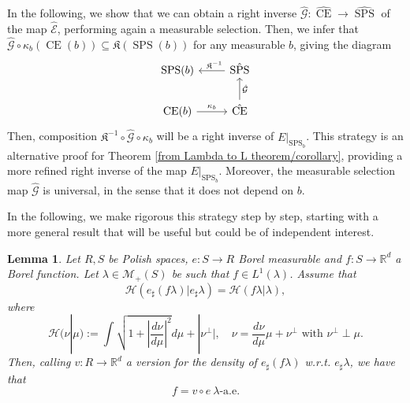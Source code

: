 \documentclass[10pt,leqno]{amsart}
\numberwithin{equation}{section}
\newtheorem{lemma}[teorema]{Lemma}
\newcommand{\R}{\mathbb{R}}
\newcommand{\CE}{\operatorname{CE}}
\begin{document}
In the following, we show that we can obtain a right inverse $\hat{\mathcal{G}}:\hat{\CE} \to \hat{\operatorname{SPS}}$ of the map $\hat{\mathcal{E}}$, performing again a measurable selection. Then, we infer that $\hat{\mathcal{G}}\circ \kappa_b(\operatorname{CE}(b)) \subseteq \mathfrak{K}(\operatorname{SPS}(b))$ for any measurable $b$, giving the diagram
\begin{equation}\label{eq: resulting diagram}
\begin{tikzcd}
  \operatorname{SPS}(b)  &  \hat{\operatorname{SPS}} \arrow[l, "\hspace{0.15cm}\mathfrak{K}^{-1}"']\\
  \CE(b) \arrow[r, "\kappa_b"] & \hat{\CE} \arrow[u, "\hat{\mathcal{G}}"']
\end{tikzcd}
\end{equation}
Then, composition $\mathfrak{K}^{-1}\circ \hat{\mathcal{G}}\circ\kappa_b$ will be a right inverse of $E|_{\operatorname{SPS}_b}$.
This strategy is an alternative proof for Theorem \ref{from Lambda to L theorem/corollary}, providing a more refined right inverse of the map $E|_{\operatorname{SPS}_b}$. Moreover, the measurable selection map $\hat{\mathcal{G}}$ is universal, in the sense that it does not depend on $b$.

In the following, we make rigorous this strategy step by step, starting with a more general result that will be useful but could be of independent interest.






\begin{lemma}\label{f = v circ e}
    Let $R,S$ be Polish spaces, $e:S\to R$ Borel measurable and $f:S\to \R^d$ a Borel function. 
    Let $\lambda\in \mathcal{M}_+(S) $ be such that $f\in L^1(\lambda)$. Assume that 
    \[\mathcal{H}\left( e_\sharp (f\lambda) | e_\sharp \lambda \right) = \mathcal{H}(f\lambda|\lambda),\]
    where 
    \[\mathcal{H}(\nu|\mu) := \int \sqrt{1+\left|\frac{d\nu}{d\mu}\right|^2} d\mu + |\nu^\perp|, \quad \nu = \frac{d\nu}{d\mu} \mu + \nu^{\perp} \text{ with }\nu^\perp \perp \mu.\]
    Then, calling $v:R \to \R^d$ a version for the density of $e_\sharp (f\lambda)$ w.r.t. $e_\sharp  \lambda$, we have that 
    \[f = v\circ e \ \lambda\text{-a.e.}\]
\end{lemma}
\end{document}
